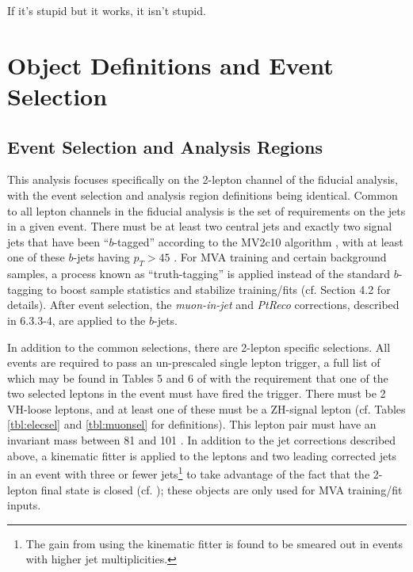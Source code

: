 \begin{savequote}[75mm]
If it's stupid but it works, it isn't stupid.
\end{savequote}

\chapter{Object Definitions and Event Selection}


\section{Event Selection and Analysis Regions}
This analysis focuses specifically on the 2-lepton channel of the fiducial analysis, with the event selection and analysis region definitions being identical.  Common to all lepton channels in the fiducial analysis is the set of requirements on the jets in a given event.  There must be at least two central jets and exactly two signal jets that have been ``$b$-tagged'' according to the MV2c10 algorithm \cite{btag}, with at least one of these $b$-jets having $p_T>45$ \GeV.  For MVA training and certain background samples, a process known as ``truth-tagging'' is applied instead of the standard $b$-tagging to boost sample statistics and stabilize training/fits (cf. \cite{supportnote} Section 4.2 for details).  After event selection, the \emph{muon-in-jet} and \emph{PtReco} corrections, described in \cite{objectnote} 6.3.3-4, are applied to the $b$-jets.

In addition to the common selections, there are 2-lepton specific selections.  All events are required to pass an un-prescaled single lepton trigger, a full list of which may be found in Tables 5 and 6 of \cite{objectnote} with the requirement that one of the two selected leptons in the event must have fired the trigger.  There must be 2 VH-loose leptons, and at least one of these must be a ZH-signal lepton (cf. Tables \ref{tbl:elecsel} and \ref{tbl:muonsel} for definitions).  This lepton pair must have an invariant mass between 81 and 101 \GeV.  In addition to the jet corrections described above, a kinematic fitter is applied to the leptons and two leading corrected jets in an event with three or fewer jets\footnote{The gain from using the kinematic fitter is found to be smeared out in events with higher jet multiplicities.} to take advantage of the fact that the 2-lepton final state is closed (cf. \cite{run1note,epsJetRes}); these objects are only used for MVA training/fit inputs.  

